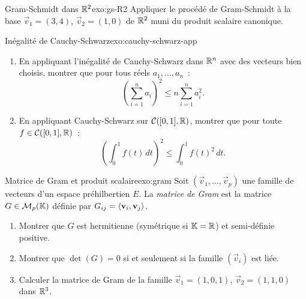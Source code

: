 \begin{exercise}{\basic{} Gram-Schmidt dans ${\mathbb{R}}^2$}{exo:gs-R2}
  Appliquer le procédé de Gram-Schmidt à la base
  $\vec{v}_1=(3,4)$, $\vec{v}_2=(1,0)$ de ${\mathbb{R}}^2$ muni du produit
  scalaire canonique.
\end{exercise}

\begin{exercise}{\basic{} Inégalité de Cauchy-Schwarz}{exo:cauchy-schwarz-app}
  \begin{enumerate}[label=(\alph*)]
    \item En appliquant l'inégalité de Cauchy-Schwarz dans ${\mathbb{R}}^n$ avec
      des vecteurs bien choisis, montrer que pour tous réels
      $a_1,\ldots,a_n$~:
      \[
        \left(\sum_{i=1}^n a_i\right)^2\leq n\sum_{i=1}^n a_i^2.
      \]
    \item En appliquant Cauchy-Schwarz sur
      $\mathcal{C}([0,1],{\mathbb{R}})$, montrer que pour toute
      $f\in\mathcal{C}([0,1],{\mathbb{R}})$~:
      \[
        \left(\int_0^1 f(t)\,dt\right)^2
        \leq\int_0^1 f(t)^2\,dt.
      \]
  \end{enumerate}
\end{exercise}

\begin{exercise}{\intermediate{} Matrice de Gram et produit scalaire}{exo:gram}
  Soit $(\vec{v}_1,\ldots,\vec{v}_p)$ une famille de vecteurs d'un
  espace préhilbertien $E$. La \emph{matrice de Gram} est la matrice
  $G\in\mathcal{M}_p({\mathbb{K}})$ définie par $G_{ij}=\langle\mathbf{v}_i,\mathbf{v}_j\rangle$.
  \begin{enumerate}[label=(\alph*)]
    \item Montrer que $G$ est hermitienne (symétrique si ${\mathbb{K}}={\mathbb{R}}$) et
      semi-définie positive.
    \item Montrer que $\det(G)=0$ si et seulement si la famille
      $(\vec{v}_i)$ est liée.
    \item Calculer la matrice de Gram de la famille
      $\vec{v}_1=(1,0,1)$, $\vec{v}_2=(1,1,0)$ dans ${\mathbb{R}}^3$.
  \end{enumerate}
\end{exercise}

